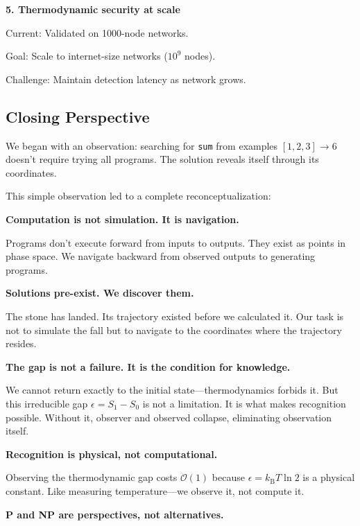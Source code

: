 \documentclass[twocolumn,10pt]{article}
\theoremstyle{definition}
\theoremstyle{remark}
\newcommand{\kB}{k_{\text{B}}}
\newcommand{\bigO}{\mathcal{O}}
\begin{document}
\vspace{0.2cm}
\noindent\textbf{5. Thermodynamic security at scale}

Current: Validated on 1000-node networks.

Goal: Scale to internet-size networks ($10^9$ nodes).

Challenge: Maintain detection latency as network grows.

\subsection{Closing Perspective}

We began with an observation: searching for \texttt{sum} from examples $[1,2,3] \to 6$ doesn't require trying all programs. The solution reveals itself through its coordinates.

This simple observation led to a complete reconceptualization:

\vspace{0.2cm}
\noindent\textbf{Computation is not simulation. It is navigation.}

Programs don't execute forward from inputs to outputs. They exist as points in phase space. We navigate backward from observed outputs to generating programs.

\vspace{0.2cm}
\noindent\textbf{Solutions pre-exist. We discover them.}

The stone has landed. Its trajectory existed before we calculated it. Our task is not to simulate the fall but to navigate to the coordinates where the trajectory resides.

\vspace{0.2cm}
\noindent\textbf{The gap is not a failure. It is the condition for knowledge.}

We cannot return exactly to the initial state—thermodynamics forbids it. But this irreducible gap $\epsilon = S_1 - S_0$ is not a limitation. It is what makes recognition possible. Without it, observer and observed collapse, eliminating observation itself.

\vspace{0.2cm}
\noindent\textbf{Recognition is physical, not computational.}

Observing the thermodynamic gap costs $\bigO(1)$ because $\epsilon = \kB T \ln 2$ is a physical constant. Like measuring temperature—we observe it, not compute it.

\vspace{0.2cm}
\noindent\textbf{P and NP are perspectives, not alternatives.}
\end{document}
